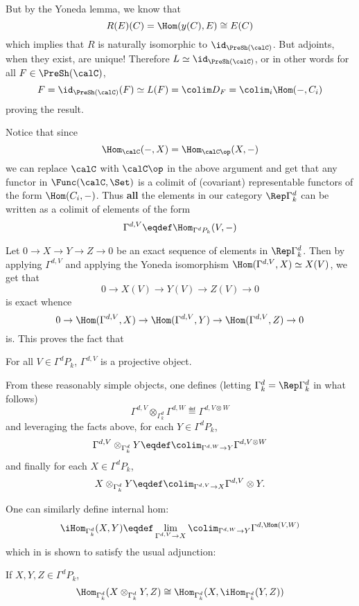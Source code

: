 \documentclass[12pt]{article}
\begin{document}
\begin{prf}
	But by the Yoneda lemma, we know that 
	\[R(E)(C)=\Hom(y(C),E)\cong E(C)\]
	which implies that $R$ is naturally isomorphic to $\id_{\PreSh(\calC)}$. But adjoints, when they exist, 
	are unique! Therefore $L\simeq\id_{\PreSh(\calC)}$, or in other words for all $F\in\PreSh(\calC)$,
	\[F=\id_{\PreSh(\calC)}(F)\simeq L(F)=\colim D_F=\colim_i \Hom(-,C_i)\]
	proving the result.
\end{prf}

Notice that since 
\[\Hom_\calC(-,X)=\Hom_{\calC\op}(X,-)\]
we can replace $\calC$ with $\calC\op$ in the above argument and get that any functor in $\Func(\calC,\Set)$ is a colimit 
of (covariant) representable functors of the form $\Hom(C_i,-)$.
Thus \textbf{all} the elements in our category $\Rep \Gamma^d_k$ can be written as a colimit of 
elements of the form 
\[\Gamma^{d,V}\eqdef\Hom_{\Gamma^dP_k}(V,-)\]

Let $0\to X\to Y\to Z\to 0$ be an exact sequence of elements in $\Rep\Gamma^d_k$. Then by applying $\Gamma^{d,V}$ and 
applying the Yoneda isomorphism $\Hom(\Gamma^{d,V},X)\simeq X(V)$, we get that 
\[0\to X(V)\to Y(V)\to Z(V)\to 0\]
is exact whence 
\[0\to \Hom(\Gamma^{d,V},X)\to \Hom(\Gamma^{d,V},Y)\to\Hom(\Gamma^{d,V},Z)\to 0\]
is. This proves the fact that 
\begin{lem}
	For all $V\in\Gamma^dP_k$, $\Gamma^{d,V}$ is a projective object.
\end{lem}

From these reasonably simple objects, one defines (letting $\Gamma^d_k=\Rep\Gamma^d_k$ in what follows)
\[\Gamma^{d,V}\otimes_{\Gamma^d_k}\Gamma^{d,W}\eqdef\Gamma^{d,V\otimes W}\]
and leveraging the facts above, for each $Y\in\Gamma^dP_k$,
\[\Gamma^{d,V}\otimes_{\Gamma^d_k} Y\eqdef\colim_{\Gamma^{d,W}\to Y}\Gamma^{d,V\otimes W}\]
and finally for each $X\in \Gamma^dP_k$,
\[X\otimes_{\Gamma^d_k} Y\eqdef\colim_{\Gamma^{d,V}\to X}\Gamma^{d,V}\otimes Y.\]

One can similarly define internal hom:
\[\iHom_{\Gamma^d_k}(X,Y)\eqdef \lim_{\Gamma^{d,V}\to X}\colim_{\Gamma^{d,W}\to Y}\Gamma^{d,\Hom(V,W)}\]
which in \cite[prop 2.4]{krause-strict-poly-func} is shown to satisfy the usual adjunction:
\begin{prop}[Krause]
	If $X,Y,Z\in\Gamma^dP_k$, 
	\[\Hom_{\Gamma^d_k}(X\otimes_{\Gamma^d_k} Y,Z)\cong\Hom_{\Gamma^d_k}(X,\iHom_{\Gamma^d_k}(Y,Z))\]
\end{prop}
\end{document}
